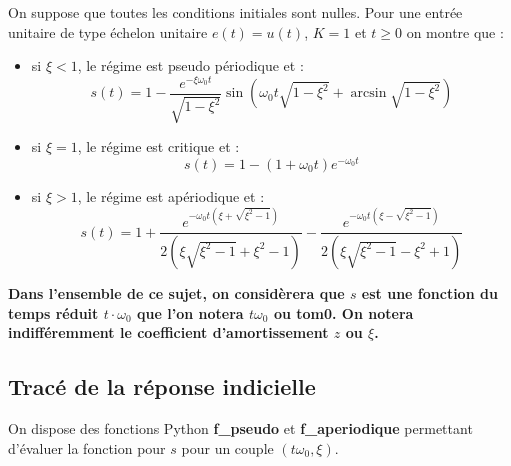 \documentclass[10pt]{article}
\newif\ifprof
\begin{document}
\vspace{.5cm}

On suppose que toutes les conditions initiales sont nulles. Pour une entrée unitaire de type échelon unitaire $e(t)=u(t)$, $K=1$ et $t\geq0$ on montre que : 
\begin{itemize}
\item si $\xi <1$, le régime est pseudo périodique et :
$$
s(t)=1-\dfrac{e^{-\xi\omega_0 t}}{\sqrt{1-\xi^2}}\sin\left(  \omega_0 t\sqrt{1-\xi^2}+\arcsin \sqrt{1-\xi^2} \right)
$$
\item si $\xi=1$, le régime est critique et : 
$$
s(t)=1-\left(1+\omega_0 t \right)e^{-\omega_0 t} 
$$
\item si $\xi>1$, le régime est apériodique et : 
$$
s(t)=1
+\dfrac{e^{- \omega_0 t\left( \xi + \sqrt{\xi^2-1}\right)}}{2\left(\xi\sqrt{\xi^2-1}+\xi^2-1 \right)}
-\dfrac{e^{- \omega_0 t \left( \xi - \sqrt{\xi^2-1}\right)}}{2\left(\xi\sqrt{\xi^2-1}-\xi^2+1 \right)}
$$
\end{itemize} 

\begin{center}
\textbf{Dans l'ensemble de ce sujet, on considèrera que $s$ est une fonction du temps réduit $t\cdot\omega_0$ que l'on notera $t\omega_0$ ou \textsf{tom0}. On notera indifféremment le coefficient d'amortissement $z$ ou $\xi$.}
\end{center}

\newpage
\fi


 

\subsection*{Tracé de la réponse indicielle}
\ifprof
\else
On dispose des fonctions Python \textbf{\textsf{f\_pseudo}} et \textbf{\textsf{f\_aperiodique}} permettant d'évaluer la fonction pour $s$ pour un couple $(t\omega_0,\xi)$.
\fi
\end{document}
